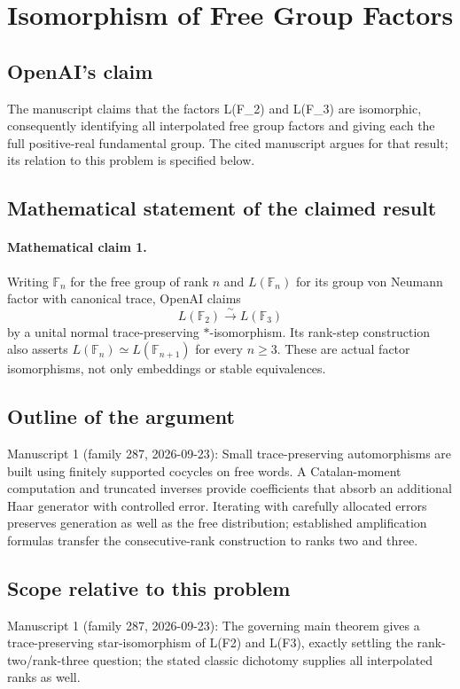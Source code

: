 \documentclass[11pt]{article}
\begin{document}
\section*{Isomorphism of Free Group Factors}

\subsection{OpenAI's claim}
The manuscript claims that the factors L(F\_2) and L(F\_3) are isomorphic, consequently identifying all interpolated free group factors and giving each the full positive-real fundamental group. The cited manuscript argues for that result; its relation to this problem is specified below.

\subsection{Mathematical statement of the claimed result}
\paragraph{Mathematical claim 1.} Writing $\mathbb F_n$ for the free group of rank $n$ and $L(\mathbb F_n)$ for its group von Neumann factor with canonical trace, OpenAI claims
\[
L(\mathbb F_2)\xrightarrow{\sim}L(\mathbb F_3)
\]
by a unital normal trace-preserving $*$-isomorphism. Its rank-step construction also asserts $L(\mathbb F_n)\simeq L(\mathbb F_{n+1})$ for every $n\ge3$. These are actual factor isomorphisms, not only embeddings or stable equivalences.

\subsection{Outline of the argument}
Manuscript 1 (family 287, 2026-09-23): Small trace-preserving automorphisms are built using finitely supported cocycles on free words. A Catalan-moment computation and truncated inverses provide coefficients that absorb an additional Haar generator with controlled error. Iterating with carefully allocated errors preserves generation as well as the free distribution; established amplification formulas transfer the consecutive-rank construction to ranks two and three.

\subsection{Scope relative to this problem}
Manuscript 1 (family 287, 2026-09-23): The governing main theorem gives a trace-preserving star-isomorphism of L(F2) and L(F3), exactly settling the rank-two/rank-three question; the stated classic dichotomy supplies all interpolated ranks as well.
\end{document}
